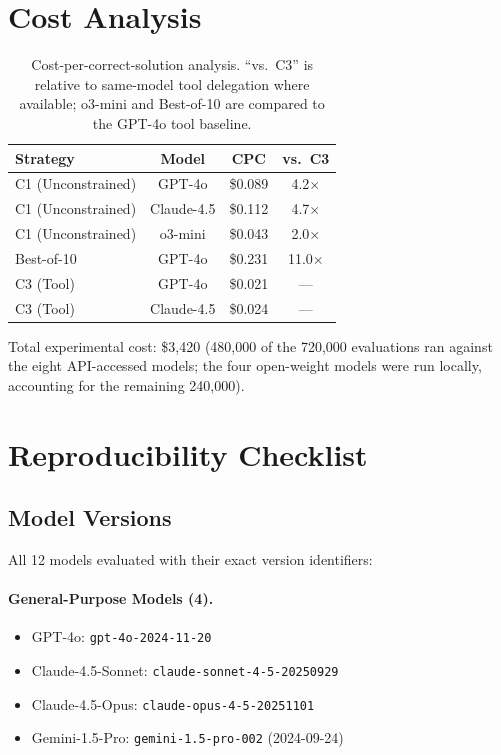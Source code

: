 \documentclass{article}
\theoremstyle{plain}
\theoremstyle{definition}
\theoremstyle{remark}
\begin{document}
\section{Cost Analysis}
\label{app:cost}

\begin{table}[h]
\centering
\caption{Cost-per-correct-solution analysis. ``vs.\ C3'' is relative to same-model tool delegation where available; o3-mini and Best-of-10 are compared to the GPT-4o tool baseline.}
\label{tab:cost}
\small
\begin{tabular}{@{}lccc@{}}
\toprule
\textbf{Strategy} & \textbf{Model} & \textbf{CPC} & \textbf{vs.\ C3} \\
\midrule
C1 (Unconstrained) & GPT-4o & \$0.089 & 4.2$\times$ \\
C1 (Unconstrained) & Claude-4.5 & \$0.112 & 4.7$\times$ \\
C1 (Unconstrained) & o3-mini & \$0.043 & 2.0$\times$ \\
Best-of-10 & GPT-4o & \$0.231 & 11.0$\times$ \\
C3 (Tool) & GPT-4o & \$0.021 & --- \\
C3 (Tool) & Claude-4.5 & \$0.024 & --- \\
\bottomrule
\end{tabular}
\end{table}

Total experimental cost: \$3,420 (480,000 of the 720,000 evaluations ran against the eight API-accessed models; the four open-weight models were run locally, accounting for the remaining 240,000).


\section{Reproducibility Checklist}
\label{app:reproduce}

\subsection{Model Versions}

All 12 models evaluated with their exact version identifiers:

\paragraph{General-Purpose Models (4).}
\begin{itemize}
\item GPT-4o: \texttt{gpt-4o-2024-11-20}
\item Claude-4.5-Sonnet: \texttt{claude-sonnet-4-5-20250929}
\item Claude-4.5-Opus: \texttt{claude-opus-4-5-20251101}
\item Gemini-1.5-Pro: \texttt{gemini-1.5-pro-002} (2024-09-24)
\end{itemize}
\end{document}
